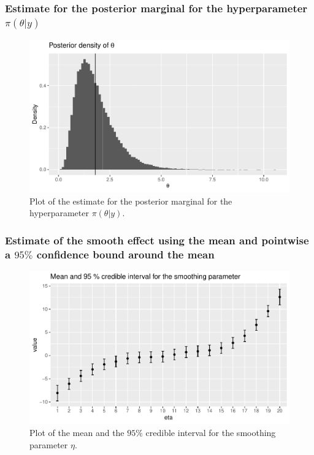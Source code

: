 \subsubsection{Estimate for the posterior marginal for the hyperparameter $\pi(\theta|y)$}
\begin{figure}[h]
    \centering
    \includegraphics[width=\textwidth]{Images/post_theta_mcmc.pdf}
    \caption{Plot of the estimate for the posterior marginal for the hyperparameter $\pi(\theta|y)$.}
    \label{fig:post_theta_mcmc}
\end{figure}

\subsubsection{Estimate of the smooth effect using the mean and pointwise a $95 \%$ confidence bound around the mean}
\begin{figure}[h]
    \centering
    \includegraphics[width=\textwidth]{Images/post_eta_mcmc.pdf}
    \caption{Plot of the mean and the $95\%$ credible interval for the smoothing parameter $\eta$. }
    \label{fig:post_eta_mcmc}
\end{figure}

